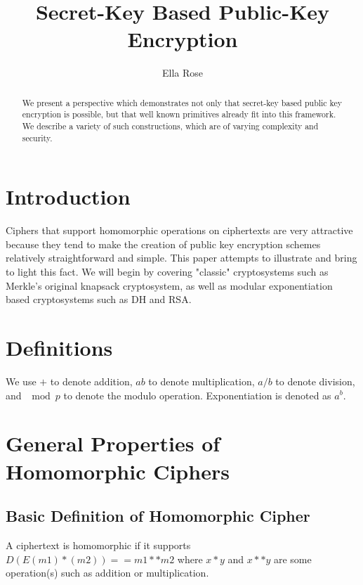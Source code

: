\documentclass[preprint]{iacrtrans}
\author{Ella Rose\inst{1}}
\institute{Paso Robles, CA\email{python_pride@protonmail.com}}
\title[Secret-Key Based Public-Key Encryption]{Secret-Key Based Public-Key Encryption}
\begin{document}
\maketitle


\begin{abstract}
 We present a perspective which demonstrates not only that secret-key based public key encryption is possible, but that well known primitives already fit into this framework. We describe a variety of such constructions, which are of varying complexity and security.
\end{abstract}

\todototoc
\listoftodos

\section{Introduction}
 Ciphers that support homomorphic operations on ciphertexts are very attractive because they tend to make the creation of public key encryption schemes relatively straightforward and simple. This paper attempts to illustrate and bring to light this fact. We will begin by covering "classic" cryptosystems such as Merkle's original knapsack cryptosystem, as well as modular exponentiation based cryptosystems such as DH and RSA.

\section{Definitions}
We use $+$ to denote addition, $ab$ to denote multiplication, $a / b$ to denote division, and $\mod p$ to denote the modulo operation. Exponentiation is denoted as $a ^ b$.

\section{General Properties of Homomorphic Ciphers}
\subsection{Basic Definition of Homomorphic Cipher}
A ciphertext is homomorphic if it supports $D(E(m1) * (m2)) == m1 ** m2$ where $x * y$ and $x ** y$ are some operation(s) such as addition or multiplication. 
\end{document}

